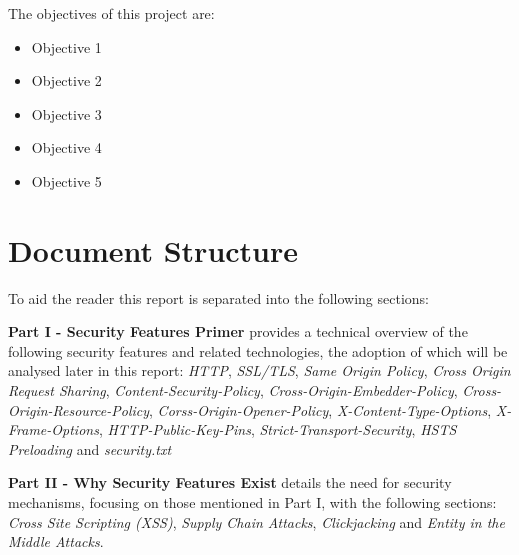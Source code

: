 \documentclass{mscreport}
\begin{document}
The objectives of this project are:
\begin{itemize}
  \item Objective 1
  \item Objective 2
  \item Objective 3
  \item Objective 4
  \item Objective 5
\end{itemize}  

\newpage

\section{Document Structure}
\label{section:doc_struct}

To aid the reader this report is separated into the following sections:

\vspace{0.3cm} \noindent
\textbf{Part I - Security Features Primer} provides a technical overview of the following security features and related technologies, the adoption of which will be analysed later in this report: \textit{HTTP}, \textit{SSL/TLS}, \textit{Same Origin Policy}, \textit{Cross Origin Request Sharing}, \textit{Content-Security-Policy}, \textit{Cross-Origin-Embedder-Policy}, \textit{Cross-Origin-Resource-Policy}, \textit{Corss-Origin-Opener-Policy}, \textit{X-Content-Type-Options}, \textit{X-Frame-Options}, \textit{HTTP-Public-Key-Pins}, \textit{Strict-Transport-Security}, \textit{HSTS Preloading} and \textit{security.txt}

\vspace{0.3cm} \noindent
\textbf{Part II - Why Security Features Exist} details the need for security mechanisms, focusing on those mentioned in Part I, with the following sections: \textit{Cross Site Scripting (XSS)}, \textit{Supply Chain Attacks}, \textit{Clickjacking} and \textit{Entity in the Middle Attacks}.
\end{document}
